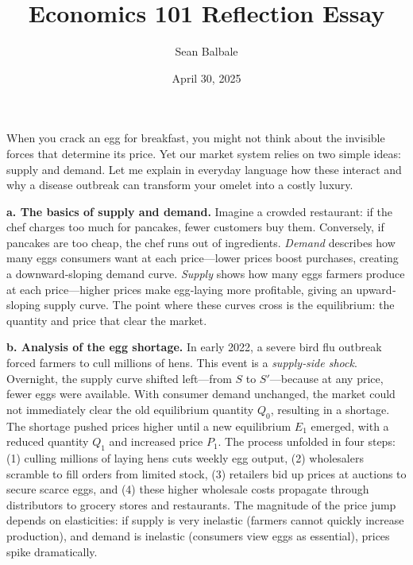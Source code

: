 \documentclass[12pt]{article}
\begin{document}
\makeatletter
\def\@maketitle{%
  \begin{center}%
  \let \footnote \thanks
    {\LARGE \@title \par}%
    {\large
      \@author \quad \@date}%
    \vskip 1em%
  \end{center}%
  \par
  }
\makeatother

\begin{doublespace}

    \title{Economics 101 Reflection Essay}
    \author{Sean Balbale}
    \date{April 30, 2025}
    


\maketitle




When you crack an egg for breakfast, you might not think about the invisible forces that determine its price. Yet our market system relies on two simple ideas: supply and demand. Let me explain in everyday language how these interact and why a disease outbreak can transform your omelet into a costly luxury.

\textbf{a. The basics of supply and demand.} Imagine a crowded restaurant: if the chef charges too much for pancakes, fewer customers buy them. Conversely, if pancakes are too cheap, the chef runs out of ingredients. \emph{Demand} describes how many eggs consumers want at each price—lower prices boost purchases, creating a downward‐sloping demand curve. \emph{Supply} shows how many eggs farmers produce at each price—higher prices make egg‐laying more profitable, giving an upward‐sloping supply curve. The point where these curves cross is the equilibrium: the quantity and price that clear the market.

\textbf{b. Analysis of the egg shortage.} In early 2022, a severe bird flu outbreak forced farmers to cull millions of hens. This event is a \emph{supply‐side shock}. Overnight, the supply curve shifted left—from $S$ to $S'$—because at any price, fewer eggs were available. With consumer demand unchanged, the market could not immediately clear the old equilibrium quantity $Q_0$, resulting in a shortage. The shortage pushed prices higher until a new equilibrium $E_1$ emerged, with a reduced quantity $Q_1$ and increased price $P_1$.  
The process unfolded in four steps: (1) culling millions of laying hens cuts weekly egg output, (2) wholesalers scramble to fill orders from limited stock, (3) retailers bid up prices at auctions to secure scarce eggs, and (4) these higher wholesale costs propagate through distributors to grocery stores and restaurants. The magnitude of the price jump depends on elasticities: if supply is very inelastic (farmers cannot quickly increase production), and demand is inelastic (consumers view eggs as essential), prices spike dramatically.


\end{doublespace}
\end{document}
